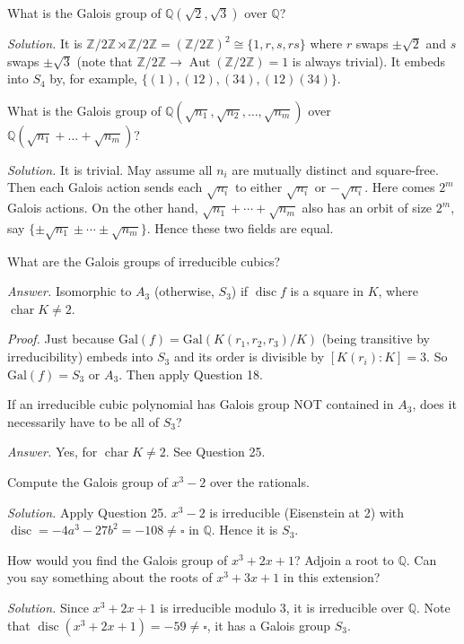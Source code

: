 \documentclass{mathproblems}
\newcommand\Q{\mathbb{Q}}
\newcommand\Z{\mathbb{Z}}
\newcommand\Gal{\mathrm{Gal}}
\DeclareMathOperator{\disc}{disc}
\begin{document}
\begin{questions}
\miquestion
{\color{blue} What is the Galois group of $\Q(\sqrt{2}, \sqrt{3})$ over $\Q$?}

\textit{Solution.}
It is $\Z/2\Z \rtimes \Z/2\Z = (\Z/2\Z)^2 \cong \{1,r,s,rs\}$ where $r$ swaps $\pm \sqrt{2}$ and $s$ swaps $\pm \sqrt{3}$ (note that $\Z/2\Z\to \operatorname{Aut}(\Z/2\Z)=1$ is always trivial). It embeds into $S_4$ by, for example, $\{(1),(12),(34),(12)(34)\}$.

\miquestion
{\color{blue} What is the Galois group of $\Q(\sqrt{n_{1}}, \sqrt{n_{2}}, \ldots, \sqrt{n_{m}})$ over $\Q(\sqrt{n_{1}}+\ldots+\sqrt{n_{m}})$?}

\textit{Solution.} It is trivial. May assume all $n_i$ are mutually distinct and square-free. Then each Galois action sends each $\sqrt{n_i}$ to either $\sqrt{n_i}$ or $-\sqrt{n_i}$. Here comes $2^m$ Galois actions. On the other hand, $\sqrt{n_1}+\cdots+\sqrt{n_m}$ also has an orbit of size $2^m$, say $\{\pm\sqrt{n_1}\pm\cdots\pm\sqrt{n_m}\}$. Hence these two fields are equal.

\miquestion
{\color{blue} What are the Galois groups of irreducible cubics?}

\textit{Answer.}
Isomorphic to $A_3$ (otherwise, $S_3$) if $\operatorname{disc} f$ is a square in $K$, where $\operatorname{char} K\neq 2$. 

\textit{Proof.}
Just because $\Gal(f)=\Gal(K(r_1,r_2,r_3)/K)$ (being transitive by irreducibility) embeds into $S_3$  and its order is divisible by $[K(r_i):K]=3$. So $\Gal(f)=S_3$ or $A_3$. Then apply Question 18.


\miquestion
{\color{blue} If an irreducible cubic polynomial has Galois group NOT contained in $A_{3}$, does it necessarily have to be all of $S_{3}$?}

\textit{Answer.}
Yes, for $\operatorname{char} K\neq 2$. See Question 25.

\miquestion
{\color{blue} Compute the Galois group of $x^{3}-2$ over the rationals.}

\textit{Solution.}
Apply Question 25. $x^{3}-2$ is irreducible (Eisenstein at 2) with $\operatorname{disc}=-4a^3-27b^2=-108 \neq \square$ in $\Q$. Hence it is $S_3$.

\miquestion
{\color{red} How would you find the Galois group of $x^{3}+2 x+1$? Adjoin a root to $\Q$. Can you say something about the roots of $x^{3}+3 x+1$ in this extension?}

\textit{Solution.} Since $x^{3}+2 x+1$ is irreducible modulo 3, it is irreducible over $\Q$. Note that $\disc(x^{3}+2 x+1)=-59\neq \square$, it has a Galois group $S_3$.


\end{questions}
\end{document}
